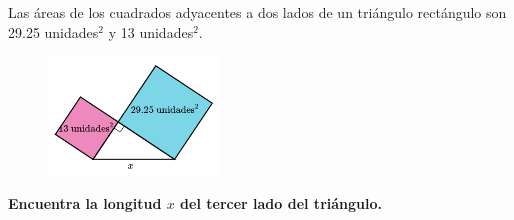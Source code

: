 \question[15]  Las áreas de los cuadrados adyacentes a dos lados de un triángulo rectángulo son 29.25 unidades$^2$ y 13 unidades$^2$.
\begin{figure}[H]
    \begin{center}
        \includegraphics[width=0.4\textwidth]{../images/area3.png}
    \end{center}
    \caption{}
    \label{fig:area3}
\end{figure}
\textbf{Encuentra la longitud $x$ del tercer lado del triángulo.}